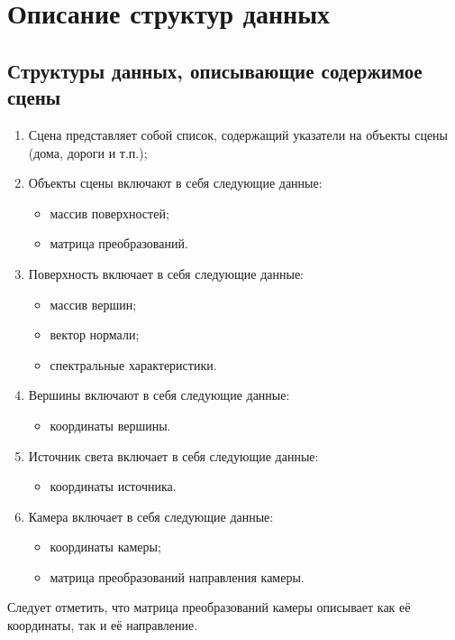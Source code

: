 \section{Описание структур данных}

\subsection*{Структуры данных, описывающие содержимое сцены}

\begin{enumerate}
    \item Сцена представляет собой список, содержащий указатели на объекты сцены (дома, дороги и т.п.);
    \item Объекты сцены включают в себя следующие данные:\begin{itemize}
        \item массив поверхностей;
        \item матрица преобразований.
    \end{itemize}
    \item Поверхность включает в себя следующие данные: \begin{itemize}
        \item массив вершин;
        \item вектор нормали;
        \item спектральные характеристики.
    \end{itemize}
    \item Вершины включают в себя следующие данные: \begin{itemize}
        \item координаты вершины.
    \end{itemize}
    \item Источник света включает в себя следующие данные: \begin{itemize}
        \item координаты источника.
    \end{itemize}
    \item Камера включает в себя следующие данные: \begin{itemize}
        \item координаты камеры; 
        \item матрица преобразований направления камеры.
    \end{itemize}
\end{enumerate}

Следует отметить, что матрица преобразований камеры описывает как её координаты, так и её направление. 

